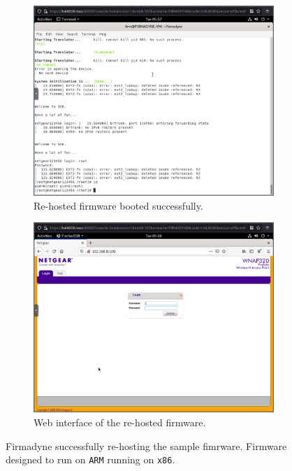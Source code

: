 \begin{figure}[H]
     \centering
     \begin{subfigure}[b]{0.45\textwidth}
         \centering
         \includegraphics[width=\textwidth]{figs/sucess.png}
         \caption{Re-hosted firmware booted successfully.}
         \label{fig:qemu-sucess1}
     \end{subfigure}
     \hfill
     \begin{subfigure}[b]{0.45\textwidth}
         \centering
         \includegraphics[width=\textwidth]{figs/sucess2.png}
         \caption{Web interface of the re-hosted firmware.}
         \label{fig:qemu-sucess2}
     \end{subfigure}
        \caption{Firmadyne successfully re-hosting the sample fimrware. Firmware designed to run on {\tt ARM} running on {\tt x86}.}
        \label{fig:emulated-sucess}
\end{figure}

